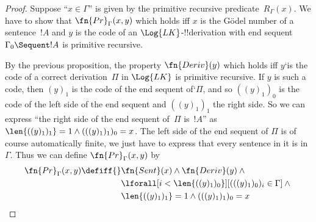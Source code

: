 \documentclass[../../include/open-logic-section]{subfiles}
\begin{document}
\begin{proof}
Suppose ``$x \in \Gamma$'' is given by the primitive recursive
predicate~$R_\Gamma(x)$. We have to show that $\fn{Pr}_\Gamma(x, y)$
which holds iff $x$ is the G\"odel number of a sentence~$!A$ and $y$
is the code of an $\Log{LK}$-!!{derivation} with end sequent
$\Gamma_0 \Sequent !A$ is primitive recursive.

By the previous proposition, the property $\fn{Deriv}(y)$ which holds
iff $y$`is the code of a correct derivation~$\Pi$ in $\Log{LK}$ is
primitive recursive.  If $y$ is such a code, then $(y)_1$ is the code
of the end sequent of`$\Pi$, and so $((y)_1)_0$ is the code of the
left side of the end sequent and $((y)_1)_1$ the right side. So we can
express ``the right side of the end sequent of~$\Pi$ is~$!A$'' as
$\len{((y)_1)_1} = 1 \land (((y)_1)_1)_0 = x$.  The left side of the
end sequent of $\Pi$ is of course automatically finite, we just have
to express that every sentence in it is in~$\Gamma$.  Thus we can
define $\fn{Pr}_\Gamma(x, y)$ by
\begin{align*}
\fn{Pr}_\Gamma(x, y) \defiff {}&
\fn{Sent}(x) \land \fn{Deriv}(y) \land {} \\
& \lforall[i <
  \len{((y)_1)_0}][(((y)_1)_0)_i \in \Gamma] \land {}\\
& \len{((y)_1)_1} = 1 \land (((y)_1)_1)_0 = x
\end{align*}
\end{proof}
\end{document}
